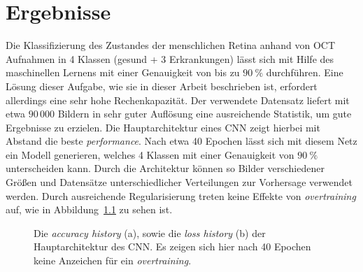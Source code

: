 \chapter{Ergebnisse}

Die Klassifizierung des Zustandes der menschlichen Retina anhand von OCT
Aufnahmen in 4 Klassen (gesund + 3 Erkrankungen) lässt sich mit Hilfe des
maschinellen Lernens mit einer Genauigkeit von bis zu $\SI{90}{\percent}$
durchführen. Eine Lösung dieser Aufgabe, wie sie in dieser Arbeit beschrieben
ist, erfordert allerdings eine sehr hohe Rechenkapazität. Der verwendete
Datensatz liefert mit etwa $90\,000$ Bildern in sehr guter Auflösung eine
ausreichende Statistik, um gute Ergebnisse zu erzielen.
Die Hauptarchitektur eines CNN zeigt hierbei mit Abstand die beste
\textit{performance}. Nach etwa 40 Epochen lässt sich mit diesem Netz ein
Modell generieren, welches 4 Klassen mit einer Genauigkeit von
$\SI{90}{\percent}$ unterscheiden kann. Durch die Architektur können so Bilder
verschiedener Größen und Datensätze unterschiedlicher Verteilungen zur
Vorhersage verwendet werden. Durch ausreichende Regularisierung treten keine
Effekte von \textit{overtraining} auf, wie in Abbildung~\ref{fig:hist} zu sehen
ist.
%
\begin{figure}[h!]
  \caption{Die \textit{accuracy history} (a), sowie die \textit{loss history} (b) der Hauptarchitektur des CNN. Es zeigen sich hier nach 40 Epochen keine Anzeichen für ein \textit{overtraining}.}
  \label{fig:hist}
\end{figure}
